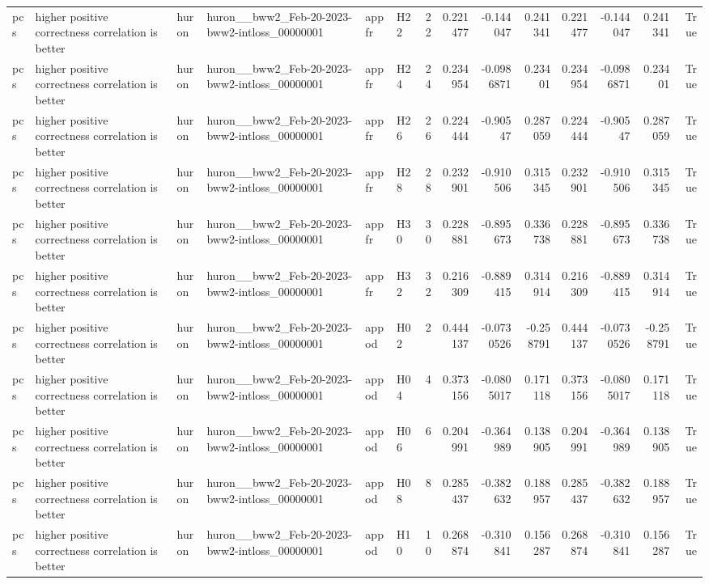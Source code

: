 \begin{longtable}{llllllrrrrrrrr}
pcs & higher positive correctness correlation is better & huron & huron\_\_bww2\_Feb-20-2023-bww2-intloss\_00000001 & appfr & H22 & 22 & 0.221477 & -0.144047 & 0.241341 & 0.221477 & -0.144047 & 0.241341 & True \\
pcs & higher positive correctness correlation is better & huron & huron\_\_bww2\_Feb-20-2023-bww2-intloss\_00000001 & appfr & H24 & 24 & 0.234954 & -0.0986871 & 0.23401 & 0.234954 & -0.0986871 & 0.23401 & True \\
pcs & higher positive correctness correlation is better & huron & huron\_\_bww2\_Feb-20-2023-bww2-intloss\_00000001 & appfr & H26 & 26 & 0.224444 & -0.90547 & 0.287059 & 0.224444 & -0.90547 & 0.287059 & True \\
pcs & higher positive correctness correlation is better & huron & huron\_\_bww2\_Feb-20-2023-bww2-intloss\_00000001 & appfr & H28 & 28 & 0.232901 & -0.910506 & 0.315345 & 0.232901 & -0.910506 & 0.315345 & True \\
pcs & higher positive correctness correlation is better & huron & huron\_\_bww2\_Feb-20-2023-bww2-intloss\_00000001 & appfr & H30 & 30 & 0.228881 & -0.895673 & 0.336738 & 0.228881 & -0.895673 & 0.336738 & True \\
pcs & higher positive correctness correlation is better & huron & huron\_\_bww2\_Feb-20-2023-bww2-intloss\_00000001 & appfr & H32 & 32 & 0.216309 & -0.889415 & 0.314914 & 0.216309 & -0.889415 & 0.314914 & True \\
pcs & higher positive correctness correlation is better & huron & huron\_\_bww2\_Feb-20-2023-bww2-intloss\_00000001 & appod & H02 & 2 & 0.444137 & -0.0730526 & -0.258791 & 0.444137 & -0.0730526 & -0.258791 & True \\
pcs & higher positive correctness correlation is better & huron & huron\_\_bww2\_Feb-20-2023-bww2-intloss\_00000001 & appod & H04 & 4 & 0.373156 & -0.0805017 & 0.171118 & 0.373156 & -0.0805017 & 0.171118 & True \\
pcs & higher positive correctness correlation is better & huron & huron\_\_bww2\_Feb-20-2023-bww2-intloss\_00000001 & appod & H06 & 6 & 0.204991 & -0.364989 & 0.138905 & 0.204991 & -0.364989 & 0.138905 & True \\
pcs & higher positive correctness correlation is better & huron & huron\_\_bww2\_Feb-20-2023-bww2-intloss\_00000001 & appod & H08 & 8 & 0.285437 & -0.382632 & 0.188957 & 0.285437 & -0.382632 & 0.188957 & True \\
pcs & higher positive correctness correlation is better & huron & huron\_\_bww2\_Feb-20-2023-bww2-intloss\_00000001 & appod & H10 & 10 & 0.268874 & -0.310841 & 0.156287 & 0.268874 & -0.310841 & 0.156287 & True \\

\end{longtable}
